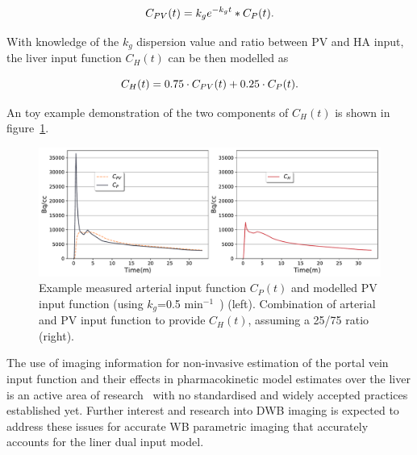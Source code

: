 \begin{equation} 
{C_{PV}}(t)  = {k_g} e^{-k_g t} \ast C_P(t)   \\ . \\
\label{eqn:PortalVein}
\end{equation}

With knowledge of the $k_g$ dispersion value and ratio between PV and HA input, the liver input function ${C_{H}}(t)$ can be then modelled as

\begin{equation} 
{C_{H}}(t)  = 0.75 \cdot C_{PV}(t) + 0.25 \cdot C_{P}(t)  \\ . \\
\label{eqn:HepaticInput}
\end{equation}

An toy example demonstration of the two components of ${C_{H}}(t)$ is shown in figure~\ref{fig_2_2:LiverDualInputFunction}.

\begin{figure} [ht!]
\centering
\includegraphics[scale=0.53,angle=0]{2_Theory_Methods/figures/2_2_LiverDualInputFunction.pdf}
\caption[Example measured arterial input function $C_{P}(t)$ and modelled PV input function (using $k_g$=0.5 min$^{-1}$) (left). Combination of arterial and PV input function to provide ${C_{H}}(t)$, assuming a 25/75 ratio (right).]{Example measured arterial input function $C_{P}(t)$ and modelled PV input function (using $k_g$=0.5 min$^{-1}$~\cite{Kudomi2008}) (left). Combination of arterial and PV input function to provide ${C_{H}}(t)$, assuming a 25/75 ratio (right).} 
\label{fig_2_2:LiverDualInputFunction}
\end{figure} 

The use of imaging information for non-invasive estimation of the portal vein input function and their effects in pharmacokinetic model estimates over the liver is an active area of research~\cite{Wang2018,HernandezLozano2019,Wang2021} with no standardised and widely accepted practices established yet. Further interest and research into DWB imaging is expected to address these issues for accurate WB parametric imaging that accurately accounts for the liner dual input model.  


